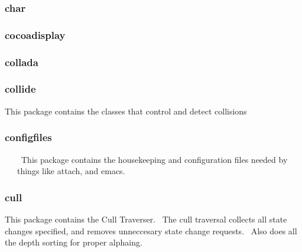 \documentclass[a4paper]{article}
\begin{document}
\clearpage\subsubsection[char]{char}
\hypertarget{RefHeading21091167907073}{}\subsubsection{}
\clearpage\subsubsection[cocoadisplay]{cocoadisplay}
\hypertarget{RefHeading21111167907073}{}\subsubsection{}
\clearpage\subsubsection[collada]{collada}
\hypertarget{RefHeading21131167907073}{}\subsubsection{}
\clearpage\subsubsection[collide]{collide}
\hypertarget{RefHeading21151167907073}{}{\color{black}
This package contains the classes that control and detect collisions}

\clearpage\subsubsection[configfiles]{configfiles}
\hypertarget{RefHeading21171167907073}{}{\color{black}
\ \ \ \ This package contains the housekeeping and configuration files needed by\newline
 \ \ \ things like attach, and emacs.}

\clearpage\subsubsection[cull]{cull}
\hypertarget{RefHeading21191167907073}{}{\color{black}
This package contains the Cull Traverser. \ The cull traversal collects all\newline
state changes specified, and removes unneccesary state change requests. \ Also\newline
does all the depth sorting for proper alphaing.}
\end{document}
